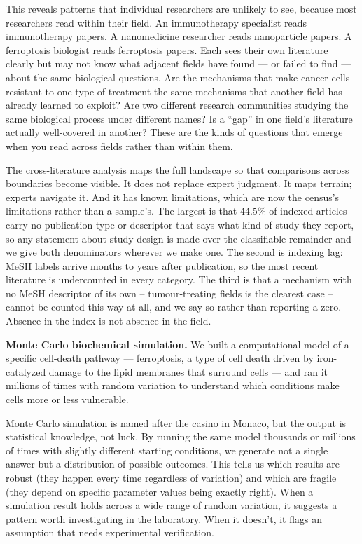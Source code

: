 \documentclass[11pt,twoside,openright]{report}
\begin{document}
This reveals patterns that individual researchers are unlikely to see, because most researchers read within their field. An immunotherapy specialist reads immunotherapy papers. A nanomedicine researcher reads nanoparticle papers. A ferroptosis biologist reads ferroptosis papers. Each sees their own literature clearly but may not know what adjacent fields have found --- or failed to find --- about the same biological questions. Are the mechanisms that make cancer cells resistant to one type of treatment the same mechanisms that another field has already learned to exploit? Are two different research communities studying the same biological process under different names? Is a ``gap'' in one field's literature actually well-covered in another? These are the kinds of questions that emerge when you read across fields rather than within them.

The cross-literature analysis maps the full landscape so that comparisons across boundaries become visible. It does not replace expert judgment. It maps terrain; experts navigate it. And it has known limitations, which are now the census's limitations rather than a sample's. The largest is that 44.5\% of indexed articles carry no publication type or descriptor that says what kind of study they report, so any statement about study design is made over the classifiable remainder and we give both denominators wherever we make one. The second is indexing lag: MeSH labels arrive months to years after publication, so the most recent literature is undercounted in every category. The third is that a mechanism with no MeSH descriptor of its own -- tumour-treating fields is the clearest case -- cannot be counted this way at all, and we say so rather than reporting a zero. Absence in the index is not absence in the field.

\textbf{Monte Carlo biochemical simulation.} We built a computational model of a specific cell-death pathway --- ferroptosis, a type of cell death driven by iron-catalyzed damage to the lipid membranes that surround cells --- and ran it millions of times with random variation to understand which conditions make cells more or less vulnerable.

Monte Carlo simulation is named after the casino in Monaco, but the output is statistical knowledge, not luck. By running the same model thousands or millions of times with slightly different starting conditions, we generate not a single answer but a distribution of possible outcomes. This tells us which results are robust (they happen every time regardless of variation) and which are fragile (they depend on specific parameter values being exactly right). When a simulation result holds across a wide range of random variation, it suggests a pattern worth investigating in the laboratory. When it doesn't, it flags an assumption that needs experimental verification.
\end{document}
